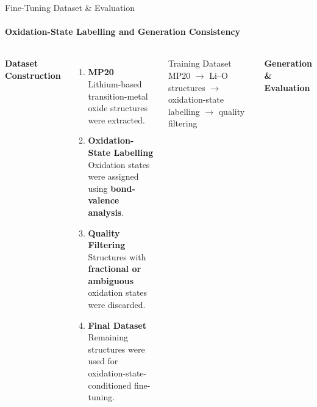 \documentclass[aspectratio=169, 11pt]{beamer}
\begin{document}
\begin{frame}{Fine-Tuning Dataset \& Evaluation}
    \framesubtitle{Oxidation-State Labelling and Generation Consistency}

    \begin{columns}[T]


        \textbf{\large Dataset Construction}

        \vspace{0.03cm}

        {\footnotesize
        \begin{enumerate}
            \setlength{\itemsep}{1pt}

            \item \textbf{MP20}\\[-2pt]
            Lithium-based transition-metal oxide
            structures were extracted.

            \item \textbf{Oxidation-State Labelling}\\[-2pt]
            Oxidation states were assigned using
            \textbf{bond-valence analysis}\cite{pymatgen2013}.

            \item \textbf{Quality Filtering}\\[-2pt]
            Structures with \textbf{fractional or ambiguous}
            oxidation states were discarded.

            \item \textbf{Final Dataset}\\[-2pt]
            Remaining structures were used for
            oxidation-state-conditioned fine-tuning.
        \end{enumerate}
        }

        \vspace{0.04cm}

        \begin{block}{\footnotesize Training Dataset}
            \centering
            \footnotesize
            MP20 $\rightarrow$ Li--O structures
            $\rightarrow$ oxidation-state labelling
            $\rightarrow$ quality filtering
        \end{block}


\textbf{\large Generation \& Evaluation}

\vspace{0.03cm}


\end{columns}
\end{frame}
\end{document}
